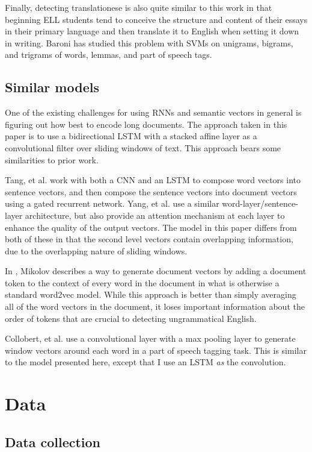 \documentclass{article} %
\begin{document}
Finally, detecting translationese is also quite similar to this work in that
beginning ELL students tend to conceive the structure and content of their essays
in their primary language and then translate it to English when setting it
down in writing. Baroni has studied this problem with SVMs on unigrams,
bigrams, and trigrams of words, lemmas, and part of speech tags.\cite{baroni}

\subsection{Similar models} \label{sim-model}

One of the existing challenges for using RNNs and semantic vectors in general
is figuring out how best to encode long documents. The approach taken in this
paper is to use a bidirectional LSTM with a stacked affine layer as a
convolutional filter over sliding windows of text.
This approach bears some similarities to prior work.

Tang, et al. work with both a CNN and an LSTM to compose word vectors into sentence
vectors, and then compose the sentence vectors into document vectors using a
gated recurrent network.\cite{tang} Yang, et al. use a similar
word-layer/sentence-layer architecture, but also provide an attention mechanism
at each layer to enhance the quality of the output vectors.\cite{yang}
The model in this
paper differs from both of these in that the second level vectors contain
overlapping information, due to the overlapping nature of sliding windows.

In \cite{mikolov}, Mikolov describes a way to generate
document vectors by adding a document token to the context of every word in the
document in what is otherwise a standard word2vec model. While this approach
is better than simply averaging all of the word vectors in the document, it
loses important information about the order of tokens that are crucial to
detecting ungrammatical English.

Collobert, et al. use
a convolutional layer with a max pooling layer to generate window vectors
around each word in a part of speech tagging task.\cite{collobert} This is similar
to the model presented here, except that I use an LSTM \textit{as} the convolution.


\section{Data} \label{data}

\subsection{Data collection}
\end{document}
